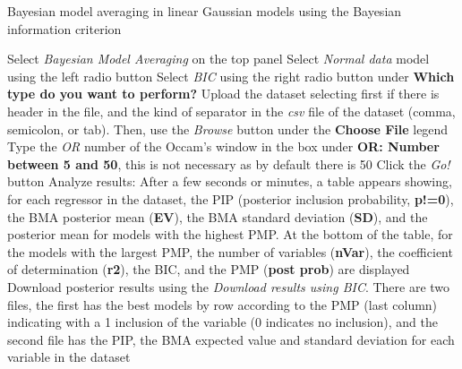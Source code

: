 \begin{algorithm}[h!]
	\caption{Bayesian model averaging in linear Gaussian models using the Bayesian information criterion}\label{alg:BMAnormalBIC}
	\begin{algorithmic}[1]  		 			
		\State Select \textit{Bayesian Model Averaging} on the top panel
		\State Select \textit{Normal data} model using the left radio button
		\State Select \textit{BIC} using the right radio button under \textbf{Which type do you want to perform?}
		\State Upload the dataset selecting first if there is header in the file, and the kind of separator in the \textit{csv} file of the dataset (comma, semicolon, or tab). Then, use the \textit{Browse} button under the \textbf{Choose File} legend
		\State Type the \textit{OR} number of the Occam's window in the box under \textbf{OR: Number between 5 and 50}, this is not necessary as by default there is 50
		\State Click the \textit{Go!} button
		\State Analyze results: After a few seconds or minutes, a table appears showing, for each regressor in the dataset, the PIP (posterior inclusion probability, \textbf{p!=0}), the BMA posterior mean (\textbf{EV}), the BMA standard deviation (\textbf{SD}), and the posterior mean for models with the highest PMP. At the bottom of the table, for the models with the largest PMP, the number of variables (\textbf{nVar}), the coefficient of determination (\textbf{r2}), the BIC, and the PMP (\textbf{post prob}) are displayed
		\State Download posterior results using the \textit{Download results using BIC}. There are two files, the first has the best models by row according to the PMP (last column) indicating with a 1 inclusion of the variable (0 indicates no inclusion), and the second file has the PIP, the BMA expected value and standard deviation for each variable in the dataset
	\end{algorithmic} 
\end{algorithm}

